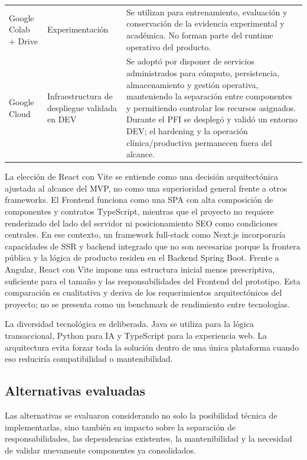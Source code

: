 {\begin{longtable}{>{\raggedright\arraybackslash}p{} >{\raggedright\arraybackslash}p{} >{\raggedright\arraybackslash}p{}}
Google Colab + Drive & Experimentación & Se utilizan para entrenamiento, evaluación y conservación de la evidencia experimental y académica. No forman parte del runtime operativo del producto. \\
Google Cloud & Infraestructura de despliegue validada en DEV & Se adoptó por disponer de servicios administrados para cómputo, persistencia, almacenamiento y gestión operativa, manteniendo la separación entre componentes y permitiendo controlar los recursos asignados. Durante el PFI se desplegó y validó un entorno DEV; el hardening y la operación clínica/productiva permanecen fuera del alcance. \\
\hline
\end{longtable}
}

La elección de React con Vite se entiende como una decisión arquitectónica ajustada al alcance del MVP, no como una superioridad general frente a otros frameworks. El Frontend funciona como una SPA con alta composición de componentes y contratos TypeScript, mientras que el proyecto no requiere renderizado del lado del servidor ni posicionamiento SEO como condiciones centrales. En ese contexto, un framework full-stack como Next.js incorporaría capacidades de SSR y backend integrado que no son necesarias porque la frontera pública y la lógica de producto residen en el Backend Spring Boot. Frente a Angular, React con Vite impone una estructura inicial menos prescriptiva, suficiente para el tamaño y las responsabilidades del Frontend del prototipo. Esta comparación es cualitativa y deriva de los requerimientos arquitectónicos del proyecto; no se presenta como un benchmark de rendimiento entre tecnologías.

La diversidad tecnológica es deliberada. Java se utiliza para la lógica transaccional, Python para IA y TypeScript para la experiencia web. La arquitectura evita forzar toda la solución dentro de una única plataforma cuando eso reduciría compatibilidad o mantenibilidad.

\subsection{Alternativas evaluadas}

Las alternativas se evaluaron considerando no solo la posibilidad técnica de implementarlas, sino también su impacto sobre la separación de responsabilidades, las dependencias existentes, la mantenibilidad y la necesidad de validar nuevamente componentes ya consolidados.

